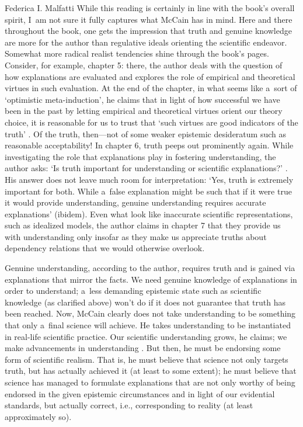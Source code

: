 \begin{recengenv}{Federica I. Malfatti}
\enlargethispage{1.5\baselineskip}
While this reading is certainly in line with the book's overall spirit, I~am not sure it fully captures what McCain has in mind. Here and there throughout the book, one gets the impression that truth and genuine knowledge are more for the author than regulative ideals orienting the scientific endeavor. Somewhat more radical realist tendencies shine through the book's pages. Consider, for example, chapter 5: there, the author deals with the question of how explanations are evaluated and explores the role of empirical and theoretical virtues in such evaluation. At the end of the chapter, in what seems like a~sort of ‘optimistic meta-induction', he claims that in light of how successful we have been in the past by letting empirical and theoretical virtues orient our theory choice, it is reasonable for us to trust that ‘such virtues are good indicators of the truth'
\parencite[][p.68]{mccain_understanding_2022}. %
 Of the truth, then---not of some weaker epistemic desideratum such as reasonable acceptability! In chapter 6, truth peeps out prominently again. While investigating the role that explanations play in fostering understanding, the author asks: ‘Is truth important for understanding or scientific explanations?' 
\parencite[][p.78]{mccain_understanding_2022}. %
 His answer does not leave much room for interpretation: ‘Yes, truth is extremely important for both. While a~false explanation might be such that if it were true it would provide understanding, genuine understanding requires accurate explanations' (ibidem). Even what look like inaccurate scientific representations, such as idealized models, the author claims in chapter 7 that they provide us with understanding only insofar as they make us appreciate truths about dependency relations that we would otherwise overlook.

Genuine understanding, according to the author, requires truth and is gained via explanations that mirror the facts. We need genuine knowledge of explanations in order to understand; a~less demanding epistemic state such as scientific knowledge (as clarified above) won't do if it does not guarantee that truth has been reached. Now, McCain clearly does not take understanding to be something that only a~final science will achieve. He takes understanding to be instantiated in real-life scientific practice. Our scientific understanding grows, he claims; we make advancements in understanding
\parencite[see, e.g.][p.68]{mccain_understanding_2022}. %
 But then, he must be endorsing some form of scientific realism. That is, he must believe that science not only targets truth, but has actually achieved it (at least to some extent); he must believe that science has managed to formulate explanations that are not only worthy of being endorsed in the given epistemic circumstances and in light of our evidential standards, but actually correct, i.e., corresponding to reality (at least approximately so).


\end{recengenv}
